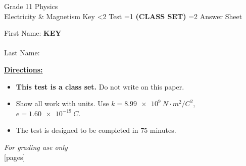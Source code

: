 \documentclass[addpoints]{exam}
\newcommand{\event}{Electricity \& Magnetism}
\newcommand{\tournament}{}
\def\type{0}
\begin{document}
\begin{center}
    {\huge Grade 11 Physics \\ \event
    \ifprintanswers \space Key
    \else \space \ifnum\type<2 Test \fi \ifnum\type=1 \textbf{(CLASS SET)} \fi
          \ifnum\type=2 Answer Sheet \fi
    \fi \\ \vspace{3mm}\tournament\vspace{1mm}}
\end{center}

\vspace{.25\textheight}

\begin{center}
    First Name: \ifprintanswers
    \underline{\hspace{3.5cm}}\textbf{KEY}\underline{\hspace{5.5cm}}\\\vspace{5mm}
    \else \underline{\hspace{10cm}}\\ \vspace{5mm} \fi
    Last Name: \underline{\hspace{10cm}}\\ \vspace{5mm}
\end{center}

\noindent\textbf{\underline{Directions:}}
\begin{itemize}
    \ifnum\type=1 \item \textbf{This test is a class set.} Do not write on this paper. \fi
    \item Show all work with units. Use $k = \SI{8.99e9}{N\cdot m^2/C^2}$,
    $e = \SI{1.60e-19}{C}$.
    \item The test is designed to be completed in 75 minutes.
\end{itemize}
\begin{center}
\textit{For grading use only}\\
[pages]
\end{center}
\end{document}
